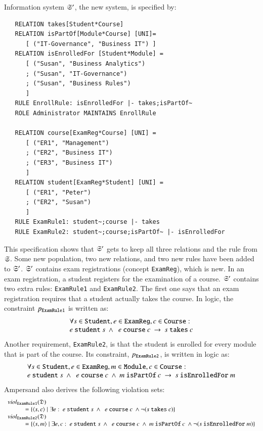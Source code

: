 \documentclass{elsarticle}
\begin{document}
   Information system $\mathfrak{S}'$, the new system, is specified by:
\begin{verbatim}
   RELATION takes[Student*Course]
   RELATION isPartOf[Module*Course] [UNI]=
      [ ("IT-Governance", "Business IT") ]
   RELATION isEnrolledFor [Student*Module] =
      [ ("Susan", "Business Analytics")
      ; ("Susan", "IT-Governance")
      ; ("Susan", "Business Rules")
      ]
   RULE EnrollRule: isEnrolledFor |- takes;isPartOf~
   ROLE Administrator MAINTAINS EnrollRule
   
   RELATION course[ExamReg*Course] [UNI] =
      [ ("ER1", "Management")
      ; ("ER2", "Business IT")
      ; ("ER3", "Business IT")
      ]
   RELATION student[ExamReg*Student] [UNI] =
      [ ("ER1", "Peter")
      ; ("ER2", "Susan")
      ]
   RULE ExamRule1: student~;course |- takes
   RULE ExamRule2: student~;course;isPartOf~ |- isEnrolledFor
\end{verbatim}
   This specification shows that $\mathfrak{S}'$ gets to keep all three relations and the rule from $\mathfrak{S}$.
   Some new population, two new relations, and two new rules have been added to $\mathfrak{S}'$.
   $\mathfrak{S}'$ contains exam registrations (concept \verb-ExamReg-), which is new.
   In an exam registration, a student registers for the examination of a course.
   $\mathfrak{S}'$ contains two extra rules: \verb-ExamRule1- and \verb-ExamRule2-.
   The first one says that an exam registration requires that a student actually takes the course.
   In logic, the constraint $p_{\tt ExamRule1}$ is written as:
\[\begin{array}{l}\forall s\in\text{\tt Student}, e\in\text{\tt ExamReg}, c\in\text{\tt Course}:\\
   e\ \text{\tt student}\ s\ \wedge\ \ e\ \text{\tt course}\ c\ \rightarrow\ s\ \text{\tt takes}\ c\\
\end{array}\]
   Another requirement, \verb-ExamRule2-, is that the student is enrolled for every module that is part of the course.
   Its constraint, $p_{\tt ExamRule2}$, is written in logic as:
\[\begin{array}{l}\forall s\in\text{\tt Student}, e\in\text{\tt ExamReg}, m\in\text{\tt Module}, c\in\text{\tt Course}:\\
   e\ \text{\tt student}\ s\ \wedge\ \ e\ \text{\tt course}\ c\ \wedge\ m\ \text{\tt isPartOf}\ c\ \rightarrow\ s\ \text{\tt isEnrolledFor}\ m
\end{array}\]
   Ampersand also derives the following violation sets:
\[\begin{array}{l}
   \viol{\text{\tt ExamRule1}}{\dataset}\\
   \hspace{1cm}=\{\pair{s}{c}\mid\exists e:\ e\ \text{\tt student}\ s\ \wedge\ \ e\ \text{\tt course}\ c\ \wedge\neg(s\ \text{\tt takes}\ c)\}\\
   \viol{\text{\tt ExamRule2}}{\dataset}\\
   \hspace{1cm}=\{\pair{s}{m}\mid\exists e,c:\ e\ \text{\tt student}\ s\ \wedge\ \ e\ \text{\tt course}\ c\ \wedge\ m\ \text{\tt isPartOf}\ c\ \wedge\neg(s\ \text{\tt isEnrolledFor}\ m)\}
\end{array}\]
\end{document}
